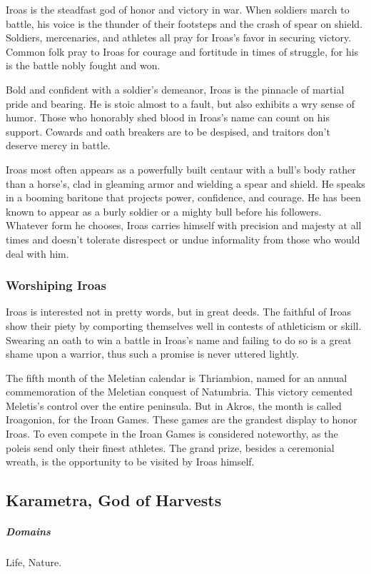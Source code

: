     Iroas is the steadfast god of honor and victory in war. When soldiers march to battle, his voice is the thunder of their footsteps and the crash of spear on shield. Soldiers, mercenaries, and athletes all pray for Iroas's favor in securing victory. Common folk pray to Iroas for courage and fortitude in times of struggle, for his is the battle nobly fought and won.

    Bold and confident with a soldier's demeanor, Iroas is the pinnacle of martial pride and bearing. He is stoic almost to a fault, but also exhibits a wry sense of humor. Those who honorably shed blood in Iroas's name can count on his support. Cowards and oath breakers are to be despised, and traitors don't deserve mercy in battle.

    Iroas most often appears as a powerfully built centaur with a bull's body rather than a horse's, clad in gleaming armor and wielding a spear and shield. He speaks in a booming baritone that projects power, confidence, and courage. He has been known to appear as a burly soldier or a mighty bull before his followers. Whatever form he chooses, Iroas carries himself with precision and majesty at all times and doesn't tolerate disrespect or undue informality from those who would deal with him.

    \subsubsection{Worshiping Iroas}
        Iroas is interested not in pretty words, but in great deeds. The faithful of Iroas show their piety by comporting themselves well in contests of athleticism or skill. Swearing an oath to win a battle in Iroas's name and failing to do so is a great shame upon a warrior, thus such a promise is never uttered lightly.

        The fifth month of the Meletian calendar is Thriambion, named for an annual commemoration of the Meletian conquest of Natumbria. This victory cemented Meletis's control over the entire peninsula. But in Akros, the month is called Iroagonion, for the Iroan Games. These games are the grandest display to honor Iroas. To even compete in the Iroan Games is considered noteworthy, as the poleis send only their finest athletes. The grand prize, besides a ceremonial wreath, is the opportunity to be visited by Iroas himself.

\subsection*{Karametra, God of Harvests} \label{ssec::karametra}
    \subparagraph{Domains} Life, Nature.

